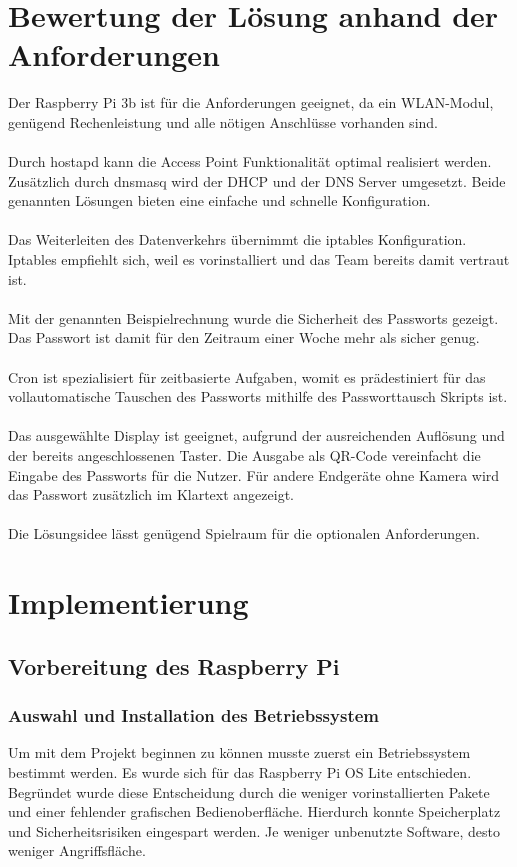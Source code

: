 \documentclass[a4paper,11pt,singlespacing]{article}
\begin{document}
	\section{Bewertung der Lösung anhand der Anforderungen}
    	Der Raspberry Pi 3b ist für die Anforderungen geeignet, da ein WLAN-Modul, genügend Rechenleistung und alle nötigen Anschlüsse vorhanden sind. \\ \\
    	Durch hostapd kann die Access Point Funktionalität optimal realisiert werden. Zusätzlich durch dnsmasq wird der DHCP und der DNS Server umgesetzt. Beide genannten Lösungen bieten eine einfache und schnelle Konfiguration. \\ \\
    	Das Weiterleiten des Datenverkehrs übernimmt die iptables Konfiguration. Iptables empfiehlt sich, weil es vorinstalliert und das Team bereits damit vertraut ist. \\ \\
    	Mit der genannten Beispielrechnung wurde die Sicherheit des Passworts gezeigt. Das Passwort ist damit für den Zeitraum einer Woche mehr als sicher genug. \\ \\
    	Cron ist spezialisiert für zeitbasierte Aufgaben, womit es prädestiniert für das vollautomatische Tauschen des Passworts mithilfe des Passworttausch Skripts ist. \\ \\
    	Das ausgewählte Display ist geeignet, aufgrund der ausreichenden Auflösung und der bereits angeschlossenen Taster. Die Ausgabe als QR-Code vereinfacht die Eingabe des Passworts für die Nutzer. Für andere Endgeräte ohne Kamera wird das Passwort zusätzlich im Klartext angezeigt. \\ \\
    	Die Lösungsidee lässt genügend Spielraum für die optionalen Anforderungen.
    	
    \section{Implementierung}
    	\subsection{Vorbereitung des Raspberry Pi}
    	\subsubsection{Auswahl und Installation des Betriebssystem}
    	    Um mit dem Projekt beginnen zu können musste zuerst ein Betriebssystem bestimmt werden.
        	Es wurde sich für das Raspberry Pi OS Lite entschieden. Begründet wurde diese Entscheidung  durch die weniger vorinstallierten Pakete und einer fehlender grafischen Bedienoberfläche. Hierdurch konnte Speicherplatz und Sicherheitsrisiken eingespart werden. Je weniger unbenutzte Software, desto weniger Angriffsfläche. \\ 
    	
\end{document}
